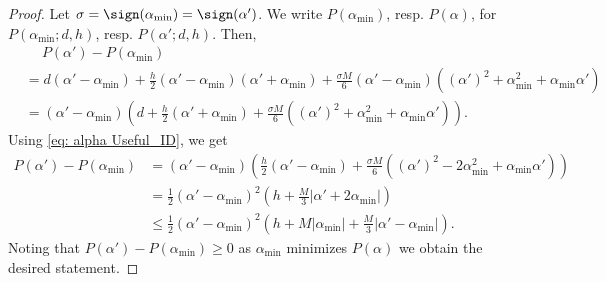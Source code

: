 \begin{proof}
    Let $\sigma = \sign(\alpha_{\mathrm{min}}) = \sign(\alpha')$. We write $P(\alpha_{\mathrm{min}})$, resp. $P(\alpha)$, for $P(\alpha_{\mathrm{min}};d,h)$, resp. $P(\alpha';d,h)$. Then,
    \begin{align*}
         & \quad~P(\alpha') - P(\alpha_{\mathrm{min}})                                                                                                                                                                                                       \\
         & = d (\alpha' - \alpha_{\mathrm{min}}) + \frac{h}{2}(\alpha' - \alpha_{\mathrm{min}})(\alpha' + \alpha_{\mathrm{min}}) + \frac{\sigma M}{6}(\alpha' - \alpha_{\mathrm{min}})((\alpha')^2 + \alpha_{\mathrm{min}}^2 + \alpha_{\mathrm{min}}\alpha') \\
         & = (\alpha' - \alpha_{\mathrm{min}})\left(d + \frac{h}{2}(\alpha' + \alpha_{\mathrm{min}}) + \frac{\sigma M}{6} ((\alpha')^2 + \alpha_{\mathrm{min}}^2 + \alpha_{\mathrm{min}} \alpha')\right).
    \end{align*}
    Using \eqref{eq: alpha Useful_ID}, we get
    \begin{align*}
        P(\alpha') - P(\alpha_{\mathrm{min}}) & = (\alpha' - \alpha_{\mathrm{min}})\left(
        \frac{h}{2}(\alpha' - \alpha_{\mathrm{min}}) + \frac{\sigma M}{6}((\alpha')^2 - 2\alpha_{\mathrm{min}}^2 + \alpha_{\mathrm{min}} \alpha')
        \right)                                                                                                                                                                                \\
                                              & = \frac{1}{2}(\alpha'- \alpha_{\mathrm{min}})^2 \left(h + \frac{M}{3}|\alpha' + 2\alpha_{\mathrm{min}}| \right)                                \\
                                              & \leq \frac{1}{2}(\alpha' - \alpha_{\mathrm{min}})^2 \left(h + M|\alpha_{\mathrm{min}}| + \frac{M}{3}|\alpha' - \alpha_{\mathrm{min}}| \right).
    \end{align*}
    Noting that $P(\alpha') - P(\alpha_{\mathrm{min}})\geq 0$ as $\alpha_{\mathrm{min}}$ minimizes $P(\alpha)$ we obtain the desired statement.
\end{proof}

